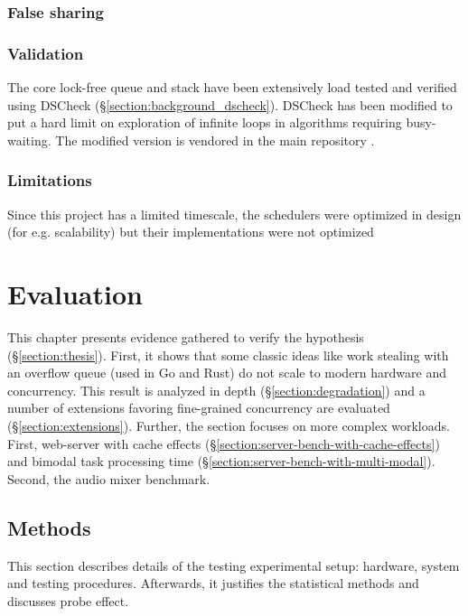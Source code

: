 \documentclass[12pt,a4paper,twoside]{report}
\begin{document}
\subsection{False sharing}

\subsection{Validation}

The core lock-free queue and stack have been extensively load tested and verified using DSCheck (\S\ref{section:background_dscheck}). DSCheck has been modified to put a hard limit on exploration of infinite loops in algorithms requiring busy-waiting. The modified version is vendored in the main repository \cite{bartoszm90:online}.

\subsection{Limitations}

Since this project has a limited timescale, the schedulers were optimized in design (for e.g. scalability) but their implementations were not optimized 




\chapter{Evaluation}
\label{chapter:evaluation}

This chapter presents evidence gathered to verify the hypothesis (\S\ref{section:thesis}). First, it shows that some classic ideas like work stealing with an overflow queue (used in Go and Rust) do not scale to modern hardware and concurrency. This result is analyzed in depth (\S\ref{section:degradation}) and a number of extensions favoring fine-grained concurrency are evaluated (\S\ref{section:extensions}). Further, the section focuses on more complex workloads. First, web-server with cache effects (\S\ref{section:server-bench-with-cache-effects}) 
and bimodal task processing time (\S\ref{section:server-bench-with-multi-modal}). Second, the audio mixer benchmark. 


\section{Methods}

This section describes details of the testing experimental setup: hardware, system and testing procedures. Afterwards, it justifies the statistical methods and discusses probe effect.
\end{document}

